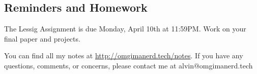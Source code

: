 \documentclass{article}
\begin{document}
\subsection*{Reminders and Homework}
The Lessig Assignment is due Monday, April 10th at 11:59PM.
Work on your final paper and projects.

\begin{center}
  You can find all my notes at \url{http://omgimanerd.tech/notes}. If you have
  any questions, comments, or concerns, please contact me at
  alvin@omgimanerd.tech
\end{center}
\end{document}
